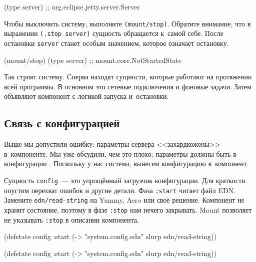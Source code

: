 \begin{english}
  \begin{clojure}
(type server)
;; org.eclipse.jetty.server.Server
  \end{clojure}
\end{english}

Чтобы выключить систему, выполните \verb|(mount/stop)|. Обратите внимание, что в
выражении \verb|(.stop server)| сущность обращается к~самой себе. После
остановки \verb|server| станет особым значением, которое означает остановку.

\begin{english}
  \begin{clojure}
(mount/stop)
(type server)
;; mount.core.NotStartedState
  \end{clojure}
\end{english}

Так строят систему. Сперва находят сущности, которые работают на протяжении всей
программы. В основном это сетевые подключения и фоновые задачи. Затем объявляют
компонент с логикой запуска и~остановки.

\subsection{Связь с конфигурацией}

Выше мы допустили ошибку: параметры сервера <<захардкожены>> в~компоненте. Мы
уже обсудили, чем это плохо; параметры должны быть в
конфигурации . Поскольку у нас система, вынесем конфигурацию
в~компонент.


Сущность \verb|config|~--- это упрощённый загрузчик конфигурации. Для краткости
опустим перехват ошибок и другие детали. Фаза \verb|:start| читает файл
EDN. Замените \texttt{edn/read\--string} на Yummy, Aero или своё
решение. Компонент не хранит состояние, поэтому в фазе \verb|:stop| нам нечего
закрывать. Mount позволяет не указывать \verb|:stop| в описании компонента.

\ifx\DEVICETYPE\MOBILE

\begin{english}
  \begin{clojure}
(defstate config
  :start
  (-> "system.config.edn"
      slurp
      edn/read-string))
  \end{clojure}
\end{english}

\else

\begin{english}
  \begin{clojure}
(defstate config
  :start
  (-> "system.config.edn" slurp edn/read-string))
  \end{clojure}
\end{english}

